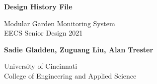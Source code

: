 \begin{titlepage}
    \begin{center}
        \vspace*{1cm}
            
        \Huge
        \textbf{Design History File}
            
        \vspace{0.5cm}
        \Large
        Modular Garden Monitoring System\\
        EECS Senior Design 2021
            
        \vspace{1.5cm}
        
        \Large
        \textbf{Sadie Gladden, Zuguang Liu, Alan Trester}
            
        \vfill
            
        University of Cincinnati\\
        College of Engineering and Applied Science
            
        \vspace{0.8cm}
            
            
    \end{center}
\end{titlepage}